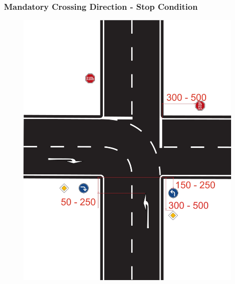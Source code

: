 \subsubsection{Mandatory Crossing Direction - Stop Condition}
\begin{figure}[H]
	\begin{center}
		\centering\includegraphics[]{graphics/Abb_14_mandatory_stop.jpg}
	\end{center}
\end{figure}

